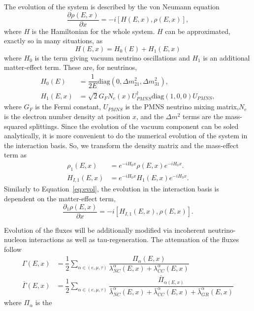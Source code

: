 \documentclass[main.tex]{subfiles}
\begin{document}
The evolution of the system is described by the von Neumann equation
\begin{equation}\label{eq:evol}
    \dfrac{\partial\rho (E,x)}{\partial x} = -i\left[ H(E,x), \rho(E,x)\right],
\end{equation}
where $H$ is the Hamiltonian for the whole system. 
$H$ can be approximated, exactly so in many situations, as 
\begin{equation}
    H(E,x) = H_{0}(E) + H_{1}(E,x)
\end{equation}
where $H_{0}$ is the term giving vacuum neutrino oscillations and $H_{1}$ is an additional matter-effect term. 
These are, for neutrinos,
\begin{align}
    H_{0}(E) &= \dfrac{1}{2E} \text{diag}\left( 0, \Delta m_{21}^{2}, \Delta m_{31}^{2}\right),  \\
    H_{1}(E,x) &= \sqrt{2}G_{F} N_{e}(x) U_{PMNS}^{\dag} \text{diag}\left( 1,0,0\right) U_{PMNS},
\end{align}
where $G_{F}$ is the Fermi constant, $U_{PMNS}$ is the PMNS neutrino mixing matrix,$N_{e}$ is the electron number density at position $x$, and the $\Delta m^{2}$ terms are the mass-squared splittings.  
Since the evolution of the vacuum component can be soled analytically, it is more convenient to do the numerical evolution of the system in the interaction basis. 
So, we transform the density matrix and the mass-effect term as 
\begin{align}
    \rho_{1}(E,x) &= e^{-i H_{0}x}\rho(E,x) e^{-iH_{0}x}. \\
    H_{I,1}(E,x)&= e^{-i H_{0}x} H_{1}(E,x) e^{-iH_{0}x}.
\end{align}
Similarly to Equation~\eqref{eq:evol}, the evolution in the interaction basis is dependent on the matter-effect term,
\begin{equation}
    \dfrac{\partial_{1}\rho (E,x)}{\partial x} = -i\left[ H_{I,1}(E,x), \rho(E,x)\right].
\end{equation}

Evolution of the fluxes will be additionally modified via incoherent neutrino-nucleon interactions as well as tau-regeneration. 
The attenuation of the fluxes follow 
\begin{align}
    \Gamma(E,x) &= \dfrac{1}{2}\sum\limits_{\alpha\in(e,\mu,\tau)} \dfrac{\Pi_{\alpha}(E,x) }{\lambda_{NC}^{\alpha}(E,x) + \lambda_{CC}^{\alpha} (E,x)} \\
    \bar{\Gamma}(E,x) &= \dfrac{1}{2}\sum_{\alpha\in(e,\mu,\tau)} \dfrac{\bar{\Pi}_{\alpha(E,x)}}{\bar{\lambda}_{NC}^{\alpha}(E,x) + \bar{\lambda}_{CC}^{\alpha}(E,x) + \bar{\lambda}_{GR}^{\alpha}(E,x) }
\end{align}
where $\Pi_{\alpha}$ is the
\end{document}

